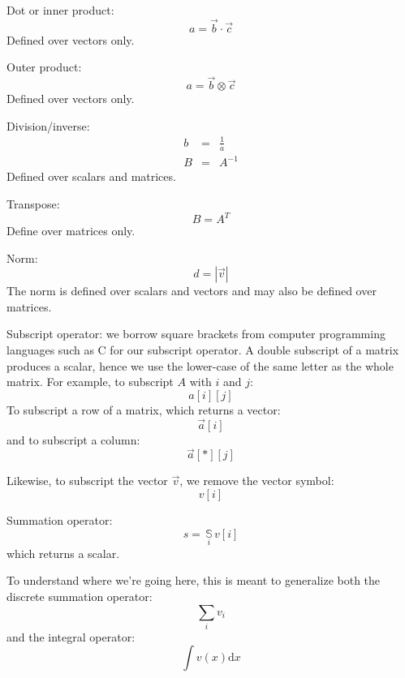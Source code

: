 \documentclass{article}
\newcommand{\inner}{\cdot}
\renewcommand{\outer}{\otimes}
\newcommand{\summation}[1]{\underset{#1}{\,\mathbb{S}\,}}
\begin{document}
Dot or inner product:
\begin{equation}
	a = \vec b \inner \vec c
\end{equation}
Defined over vectors only.

Outer product:
\begin{equation}
	a = \vec b \outer \vec c
\end{equation}
Defined over vectors only.

Division/inverse:
\begin{eqnarray}
	b & = & \frac{1}{a} \\
	B & = & A^{-1}
\end{eqnarray}
Defined over scalars and matrices.

Transpose:
\begin{equation}
	B = A^T
\end{equation}
Define over matrices only.

Norm:
\begin{equation}
	d = | \vec v |
\end{equation}
The norm is defined over scalars and vectors and may also be defined over
matrices.

Subscript operator: we borrow square brackets from computer programming
languages such as C for our subscript operator.
A double subscript of a matrix produces a scalar, hence we use the lower-case
of the same letter as the whole matrix.
For example, to subscript $A$ with $i$ and $j$:
\begin{equation}
	a[i][j]
\end{equation}
To subscript a row of a matrix, which returns a vector:
\begin{equation}
	\vec a[i]
\end{equation}
and to subscript a column:
\begin{equation}
	\vec a[*][j]
\end{equation}

Likewise, to subscript the vector $\vec v$, we remove the vector symbol:
\begin{equation}
	v[i]
\end{equation}

Summation operator:
\begin{equation}
	s=\summation{i} v[i]
\end{equation}
which returns a scalar.

To understand where we're going here, this is meant to generalize both the 
discrete summation operator:
\begin{equation}
	\sum_i v_i
\end{equation}
and the integral operator:
\begin{equation}
	\int v(x) \mathrm d x
\end{equation}
\end{document}
